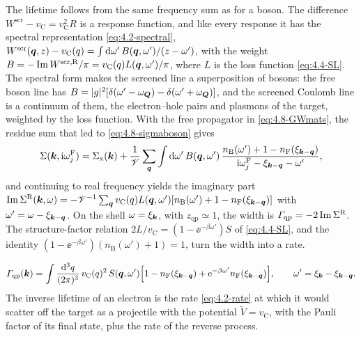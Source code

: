 The lifetime follows from the same frequency sum as for a boson. The difference $W^{\mathrm{scr}} - v_{\mathrm{C}} = v_{\mathrm{C}}^2R$ is a response function, and like every response it has the spectral representation \cref{eq:4.2-spectral}, $W^{\mathrm{scr}}(\bm{q},z) - v_{\mathrm{C}}(q) = \int\mathrm{d}\omega'\,B(\bm{q},\omega')/(z - \omega')$, with the weight $B = -\operatorname{Im} W^{\mathrm{scr},\mathrm{R}}/\pi = v_{\mathrm{C}}(q)L(\bm{q},\omega')/\pi$, where $L$ is the loss function \cref{eq:4.4-SL}. The spectral form makes the screened line a superposition of bosons: the free boson line has $B = |g|^2[\delta(\omega' - \omega_{\bm{Q}}) - \delta(\omega' + \omega_{\bm{Q}})]$, and the screened Coulomb line is a continuum of them, the electron--hole pairs and plasmons of the target, weighted by the loss function. With the free propagator in \cref{eq:4.8-GWmats}, the residue sum that led to \cref{eq:4.8-sigmaboson} gives
\begin{equation*}
  \Sigma(\bm{k},\mathrm{i}\omega^{\mathrm{F}}_j) = \Sigma_{\mathrm{x}}(\bm{k}) + \frac1{\mathscr{V}}\sum_{\bm{q}}\int\mathrm{d}\omega'\,B(\bm{q},\omega')\,\frac{n_{\mathrm{B}}(\omega') + 1 - n_{\mathrm{F}}(\xi_{\bm{k}-\bm{q}})}{\mathrm{i}\omega^{\mathrm{F}}_j - \xi_{\bm{k}-\bm{q}} - \omega'} ,
\end{equation*}
and continuing to real frequency yields the imaginary part $\operatorname{Im}\Sigma^{\mathrm{R}}(\bm{k},\omega) = -\mathscr{V}^{-1}\sum_{\bm{q}}v_{\mathrm{C}}(q)L(\bm{q},\omega')[n_{\mathrm{B}}(\omega') + 1 - n_{\mathrm{F}}(\xi_{\bm{k}-\bm{q}})]$ with $\omega' = \omega - \xi_{\bm{k}-\bm{q}}$. On the shell $\omega = \xi_{\bm{k}}$, with $z_{\mathrm{qp}} \simeq 1$, the width is $\varGamma_{\mathrm{qp}} = -2\operatorname{Im}\Sigma^{\mathrm{R}}$. The structure-factor relation $2L/v_{\mathrm{C}} = (1 - \ee^{-\beta\omega'})S$ of \cref{eq:4.4-SL}, and the identity $(1 - \ee^{-\beta\omega'})(n_{\mathrm{B}}(\omega') + 1) = 1$, turn the width into a rate.
\begin{keyresult}
\begin{equation}
  \varGamma_{\mathrm{qp}}(\bm{k}) = \int\frac{\mathrm{d}^3q}{(2\pi)^3}\,v_{\mathrm{C}}(q)^2\,S(\bm{q},\omega')\Bigl[1 - n_{\mathrm{F}}(\xi_{\bm{k}-\bm{q}}) + \mathrm{e}^{-\beta\omega'}n_{\mathrm{F}}(\xi_{\bm{k}-\bm{q}})\Bigr], \qquad \omega' = \xi_{\bm{k}} - \xi_{\bm{k}-\bm{q}} .
  \label{eq:4.8-lifetime}
\end{equation}
The inverse lifetime of an electron is the rate \cref{eq:4.2-rate} at which it would scatter off the target as a projectile with the potential $\tilde V = v_{\mathrm{C}}$, with the Pauli factor of its final state, plus the rate of the reverse process.
\end{keyresult}
